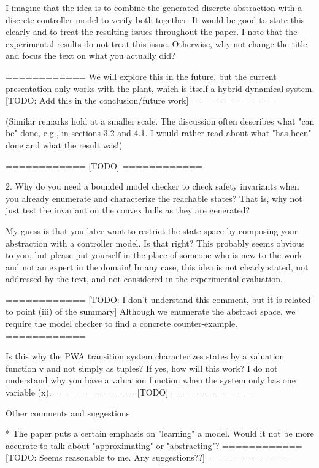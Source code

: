    I imagine that the idea is to combine the generated discrete abstraction
   with a discrete controller model to verify both together. It would be
   good to state this clearly and to treat the resulting issues throughout
   the paper. I note that the experimental results do not treat this issue.
   Otherwise, why not change the title and focus the text on what you
   actually did?

   ============
   We will explore this in the future, but the current presentation
   only works with the plant, which is itself a hybrid dynamical
   system.
   [TODO: Add this in the conclusion/future work]
   ============


   (Similar remarks hold at a smaller scale. The discussion often describes
    what "can be" done, e.g., in sections 3.2 and 4.1. I would rather read
    about what "has been" done and what the result was!)
  
   ============
   [TODO]
   ============

2. Why do you need a bounded model checker to check safety invariants when
   you already enumerate and characterize the reachable states? That is, why
   not just test the invariant on the convex hulls as they are generated?

   My guess is that you later want to restrict the state-space by composing
   your abstraction with a controller model. Is that right? This probably
   seems obvious to you, but please put yourself in the place of someone who
   is new to the work and not an expert in the domain! In any case, this
   idea is not clearly stated, not addressed by the text, and not considered
   in the experimental evaluation.

   ============
   [TODO: I don't understand this comment, but it is related to
   point (iii) of the summary]
   Although we enumerate the abstract space, we require the model
   checker to find a concrete counter-example.
   ============

   Is this why the PWA transition system characterizes states by a valuation
   function v and not simply as tuples? If yes, how will this work? I do not
   understand why you have a valuation function when the system only has one
   variable (x).
   ============
   [TODO]
   ============

Other comments and suggestions

* The paper puts a certain emphasis on "learning" a model. Would it not be
  more accurate to talk about "approximating" or "abstracting"?
   ============
   [TODO: Seems reasonable to me. Any suggestions??]
   ============

